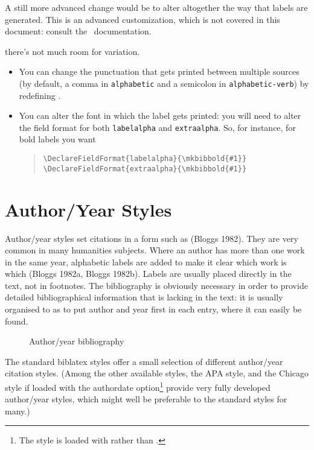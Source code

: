 A still more advanced change would be to alter altogether the way that
labels are generated. This is an advanced customization, which is not
covered in this document: consult the \biblatex\
documentation.

 there's not much room for
variation.
\begin{itemize}
\item You can change the punctuation that gets printed between
  multiple sources (by default, a comma in \verb|alphabetic| and a
  semicolon in \verb|alphabetic-verb|) by redefining
  .
\item You can alter the font in which the label gets printed: you will
  need to alter the field format for both \verb|labelalpha| and
  \verb|extraalpha|. So, for instance, for bold labels you want
\begin{quote}
\verb|\DeclareFieldFormat{labelalpha}{\mkbibbold{#1}}|\\
\verb|\DeclareFieldFormat{extraalpha}{\mkbibbold{#1}}|
\end{quote}
\end{itemize}

\section{Author/Year Styles}

Author/year styles set citations in a form such as (Bloggs 1982). They
are very common in many humanities subjects. Where an author has more
than one work in the same year, alphabetic labels are added to make it
clear which work is which (Bloggs 1982a, Bloggs 1982b). Labels are
usually placed directly in the text, not in footnotes. The
bibliography is obviously necessary in order to provide detailed
bibliographical information that is lacking in the text: it is usually
organised to as to put author and year first in each entry, where it
can easily be found.

\begin{figure}
\caption{Author/year bibliography\label{example:bibliography:authoryear}}
\fbox{\texttt{[image: ./examples/cotton-authoryearu.pdf]}}
\end{figure}

The standard biblatex styles offer a small selection of different
author/year citation styles. (Among the other available styles, the
APA style, and the Chicago style if loaded with the authordate
option\footnote{The  style is loaded with
   rather than
  .} provide very fully
developed author/year styles, which might well be preferable to the
standard styles for many.)

